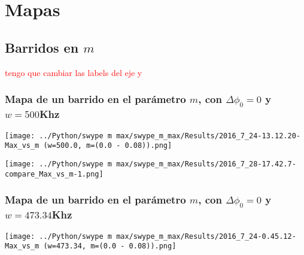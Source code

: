 \chapter{Mapas}

	\section{Barridos en $m$}
	\textcolor{red}{tengo que cambiar las labels del eje y}
	
		\subsection{Mapa de un barrido en el parámetro $m$, con $\Delta \phi_0 = 0 $ y $w=500$Khz}
		
			\begin{center}
				\texttt{[image: ../Python/swype m max/swype\_m\_max/Results/2016\_7\_24-13.12.20-Max\_vs\_m (w=500.0, m=(0.0 - 0.08)).png]}
				\label{fig: mapa m 500 }
			\end{center}
			
			
			\begin{center}
				\texttt{[image: ../Python/swype m max/swype\_m\_max/Results/2016\_7\_28-17.42.7-compare\_Max\_vs\_m-1.png]}
				\label{fig: mapa m 500 colores}
			\end{center}
			
			
		\subsection{Mapa de un barrido en el parámetro $m$, con $\Delta \phi_0 = 0 $ y $w=473.34$Khz}
		
			\begin{center}
				\texttt{[image: ../Python/swype m max/swype\_m\_max/Results/2016\_7\_24-0.45.12-Max\_vs\_m (w=473.34, m=(0.0 - 0.08)).png]}
				\label{fig: mapa m 379 histeresis}
			\end{center}
			
